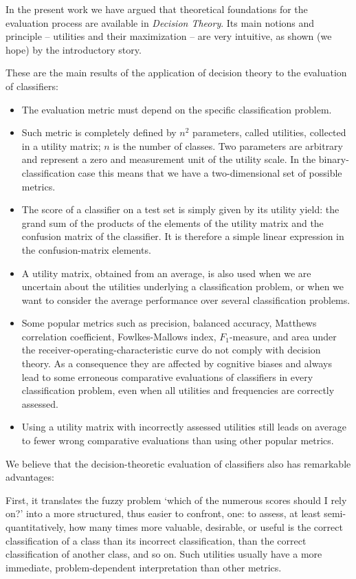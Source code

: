 \documentclass[\ifafour a4paper,12pt,\else a5paper,10pt,\fi%
onecolumn,oneside,article,%
british%
]{memoir}
\theoremstyle{remark}
\theoremstyle{innote}
\renewcommand*{\|}[1][]{\nonscript\:#1\vert\nonscript\:\mathopen{}}
\begin{document}
In the present work we have argued that theoretical foundations for the evaluation process are available in \emph{Decision Theory}. Its main notions and principle -- utilities and their maximization -- are very intuitive, as shown (we hope) by the introductory story.

These are the main results of the application of decision theory to the evaluation of classifiers:
\begin{itemize}[--,wide]
\item The evaluation metric must depend on the specific classification problem.
\item Such metric is completely defined by $n^{2}$ parameters, called utilities, collected in a utility matrix; $n$ is the number of classes. Two parameters are arbitrary and represent a zero and measurement unit of the utility scale. In the binary-classification case this means that we have a two-dimensional set of possible metrics.
\item The score of a classifier on a test set is simply given by its utility yield: the grand sum of the products of the elements of the utility matrix and the confusion matrix of the classifier. It is therefore a simple linear expression in the confusion-matrix elements.
\item A utility matrix, obtained from an average, is also used when we are uncertain about the utilities underlying a classification problem, or when we want to consider the average performance over several classification problems.
\item Some popular metrics such as precision, balanced accuracy, Matthews correlation coefficient, Fowlkes-Mallows index, $F_{1}$-measure, and area under the receiver-operating-characteristic curve do not comply with decision theory. As a consequence they are affected by cognitive biases and always lead to some erroneous comparative evaluations of classifiers in every classification problem, even when all utilities and frequencies are correctly assessed.
\item Using a utility matrix with incorrectly assessed utilities still leads on average to fewer wrong comparative evaluations than using other popular metrics.
\end{itemize}

We believe that the decision-theoretic evaluation of classifiers also has remarkable advantages:

First, it translates the fuzzy problem \enquote*{which of the numerous scores should I rely on?} into a more structured, thus easier to confront, one: to assess, at least semi-quantitatively, how many times more valuable, desirable, or useful is the correct classification of a class than its incorrect classification, than the correct classification of another class, and so on. Such utilities usually have a more immediate, problem-dependent interpretation than other metrics.
\end{document}
